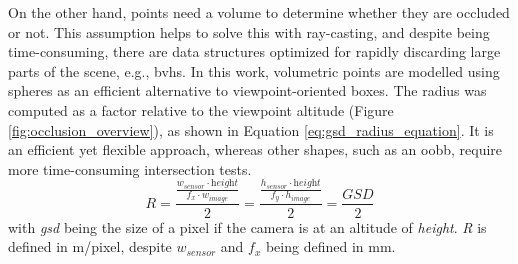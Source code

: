 On the other hand, points need a volume to determine whether they are occluded or not. This assumption helps to solve this with ray-casting, and despite being time-consuming, there are data structures optimized for rapidly discarding large parts of the scene, e.g., \acrshort{bvh}s. In this work, volumetric points are modelled using spheres as an efficient alternative to viewpoint-oriented boxes. The radius was computed as a factor relative to the viewpoint altitude (Figure \ref{fig:occlusion_overview}), as shown in Equation \ref{eq:gsd_radius_equation}. It is an efficient yet flexible approach, whereas other shapes, such as an \acrshort{oobb}, require more time-consuming intersection tests.
\begin{equation}
    \label{eq:gsd_radius_equation}
    R = \frac{\frac{w_{\textit{sensor}} \cdot \textit{height}}{f_x \cdot w_{\textit{image}}}}{2} = \frac{\frac{h_{\textit{sensor}} \cdot \textit{height}}{f_y \cdot h_{\textit{image}}}}{2} = \frac{\textit{GSD}}{2}
\end{equation}
with \textit{\acrshort{gsd}} being the size of a pixel if the camera is at an altitude of \textit{height}. \textit{R} is defined in \si{\meter}/pixel, despite $w_{\textit{sensor}}$ and $f_x$ being defined in \si{\milli\meter}.

